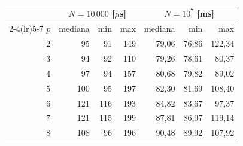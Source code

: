 \begin{tabular}{rrrrrrr}
\toprule
 & \multicolumn{3}{c}{$N=10\,000$ [$\mu$s]} & \multicolumn{3}{c}{$N=10^7$ [ms]} \\
\cmidrule(lr){2-4}\cmidrule(lr){5-7}
$p$ & mediana & min & max & mediana & min & max \\
\midrule
2 & 95 & 91 & 149 & 79,06 & 76,86 & 122,34 \\
3 & 94 & 92 & 110 & 79,26 & 78,61 & 80,37 \\
4 & 97 & 94 & 157 & 80,68 & 79,82 & 89,02 \\
5 & 100 & 95 & 197 & 82,30 & 81,69 & 108,40 \\
6 & 121 & 116 & 193 & 84,82 & 83,67 & 97,37 \\
7 & 121 & 115 & 199 & 87,81 & 86,97 & 119,14 \\
8 & 108 & 96 & 196 & 90,48 & 89,92 & 107,92 \\
\bottomrule
\end{tabular}
